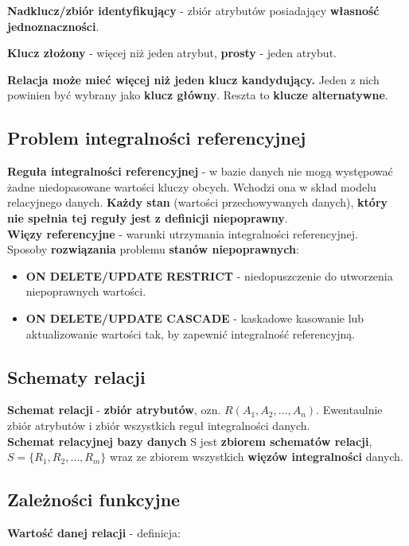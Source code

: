 \documentclass[a4paper]{article}
\begin{document}
\textbf{Nadklucz/zbiór identyfikujący} - zbiór atrybutów posiadający \textbf{własność jednoznaczności}.

\textbf{Klucz złożony} - więcej niż jeden atrybut, \textbf{prosty} - jeden atrybut.

\textbf{Relacja może mieć więcej niż jeden klucz kandydujący. } Jeden z nich powinien być wybrany jako \textbf{klucz główny}. Reszta to \textbf{klucze alternatywne}.\\

\subsection{Problem integralności referencyjnej}
\textbf{Reguła integralności referencyjnej} - w bazie danych nie mogą występować żadne niedopasowane wartości kluczy obcych. Wchodzi ona w skład modelu relacyjnego danych. \textbf{Każdy stan} (wartości przechowywanych danych), \textbf{który nie spełnia tej reguły jest z definicji niepoprawny}.\\
\textbf{Więzy referencyjne} - warunki utrzymania integralności referencyjnej.\\

Sposoby \textbf{rozwiązania} problemu \textbf{stanów niepoprawnych}:
\begin{itemize}
    \item \textbf{ON DELETE/UPDATE RESTRICT} - niedopuszczenie do utworzenia niepoprawnych wartości.
    \item \textbf{ON DELETE/UPDATE CASCADE} - kaskadowe kasowanie lub aktualizowanie wartości tak, by zapewnić integralność referencyjną.
\end{itemize}

\subsection{Schematy relacji}
\textbf{Schemat relacji} - \textbf{zbiór atrybutów}, ozn. $R(A_1,A_2, \dots ,A_n)$. Ewentaulnie zbiór atrybutów i zbiór wszystkich reguł integralności danych.\\
\textbf{Schemat relacyjnej bazy danych} S jest \textbf{zbiorem schematów relacji}, $S=\{ R_1, R_2, \dots , R_m \}$ wraz ze zbiorem wszystkich \textbf{więzów integralności} danych.

\subsection{Zależności funkcyjne}
\textbf{Wartość danej relacji} - definicja:
\end{document}
